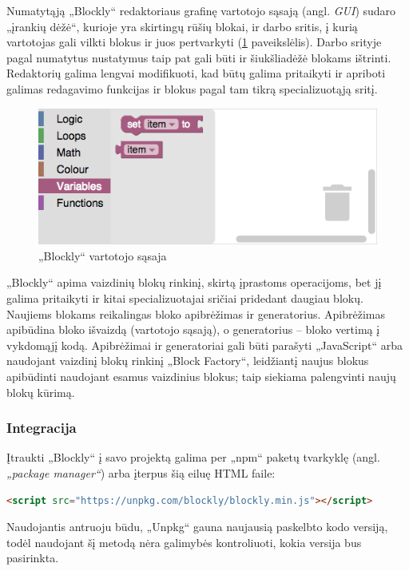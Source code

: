 \documentclass{VUMIFPSkursinis}
\begin{document}
Numatytąją „Blockly“ redaktoriaus grafinę vartotojo sąsają (angl. \textit{GUI}) sudaro „įrankių dėžė“, kurioje yra skirtingų rūšių blokai, ir darbo sritis, į kurią vartotojas gali vilkti blokus ir juos pertvarkyti (\ref{img:toolbox} paveikslėlis). Darbo srityje pagal numatytus nustatymus taip pat gali būti ir šiukšliadėžė blokams ištrinti. Redaktorių galima lengvai modifikuoti, kad būtų galima pritaikyti ir apriboti galimas redagavimo funkcijas ir blokus pagal tam tikrą specializuotąją sritį.

\begin{figure}[H]
    \centering
    \includegraphics[scale=0.6]{img/toolbox.png}
    \caption{„Blockly“ vartotojo sąsaja}
    \label{img:toolbox}
\end{figure}

„Blockly“ apima vaizdinių blokų rinkinį, skirtą įprastoms operacijoms, bet jį galima pritaikyti ir kitai specializuotajai sričiai pridedant daugiau blokų. Naujiems blokams reikalingas bloko apibrėžimas ir generatorius. Apibrėžimas apibūdina bloko išvaizdą (vartotojo sąsają), o generatorius -- bloko vertimą į vykdomąjį kodą. Apibrėžimai ir generatoriai gali būti parašyti „JavaScript“ arba naudojant vaizdinį blokų rinkinį „Block Factory“, leidžiantį naujus blokus apibūdinti naudojant esamus vaizdinius blokus; taip siekiama palengvinti naujų blokų kūrimą.

\subsubsection{Integracija}
Įtraukti „Blockly“ į savo projektą galima per „npm“ paketų tvarkyklę (angl. \textit{„package manager“}) arba įterpus šią eiluę HTML faile: 
\begin{lstlisting}[language=HTML]
<script src="https://unpkg.com/blockly/blockly.min.js"></script>
\end{lstlisting}
Naudojantis antruoju būdu, „Unpkg“ gauna naujausią paskelbto kodo versiją, todėl naudojant šį metodą nėra galimybės kontroliuoti, kokia versija bus pasirinkta.
\end{document}
